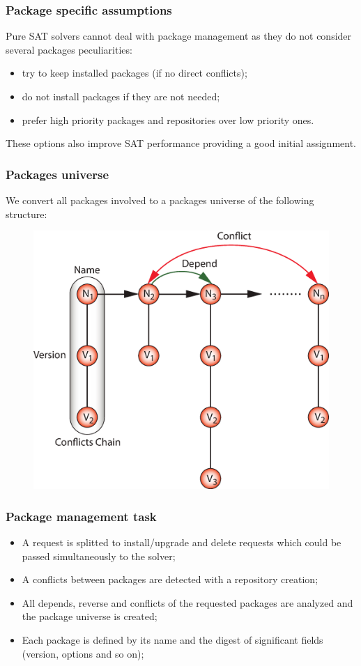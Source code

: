 \documentclass{beamer}
\begin{document}
\begin{frame}
\frametitle{Package specific assumptions}
Pure SAT solvers cannot deal with package management as they do not consider
several packages peculiarities:
\begin{itemize}
  \item try to keep installed packages (if no direct conflicts);
  \item do not install packages if they are not needed;
  \item prefer high priority packages and repositories over low priority ones.
\end{itemize}
These options also improve SAT performance providing a good initial assignment.
\end{frame}

\begin{frame}
\frametitle{Packages universe}
We convert all packages involved to a packages universe of the following
structure:
\begin{figure}[h!]
  \centering
  \includegraphics[height=0.7\textheight]{q5.eps}
\end{figure}
\end{frame}

\begin{frame}
\frametitle{Package management task}
\begin{itemize}
  \item A request is splitted to install/upgrade and delete requests which
  could be passed simultaneously to the solver;
  \item A conflicts between packages are detected with a repository creation;
  \item All depends, reverse and conflicts of the requested packages are
  analyzed and the package universe is created;
  \item Each package is defined by its name and the digest of significant
  fields (version, options and so on);
\end{itemize}
\end{frame}
\end{document}
